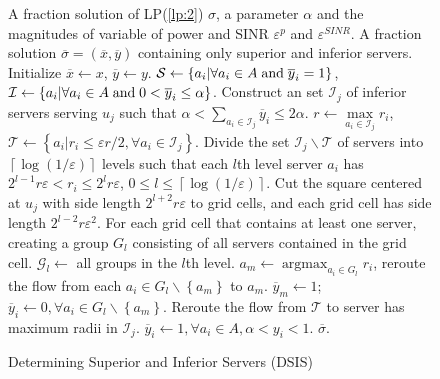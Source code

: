 \documentclass[11pt,a4paper]{article}
\begin{document}
\begin{figure}[!t]
	\renewcommand{\algorithmicrequire}{\textbf{Input:}}
	\renewcommand{\algorithmicensure}{\textbf{Output:}}
	\begin{algorithm}[H]
		\caption{Determining Superior and Inferior Servers (DSIS)}
		\begin{algorithmic}[1]\label{alg:DSIS}
			\REQUIRE A fraction solution of LP(\ref{lp:2}) $\sigma$, a parameter $\alpha$ and the magnitudes of variable of power and SINR ${\varepsilon ^p}$ and ${\varepsilon ^{SINR}}$.
			\ENSURE A fraction solution $\overline \sigma = ({\overline x},{\overline y})$ containing only superior and inferior servers.
			\STATE Initialize $\overline x \leftarrow x$, $\overline y \leftarrow y$.
			\STATE ${\mathcal{S}} \leftarrow \left\{ {{a_i}|\forall{a_i} \in A\; {\rm{and}} \; {{\overline y}_i} = 1} \right\}$, ${\mathcal{I}} \leftarrow \left\{ {{a_i}|\forall{a_i} \in A\; {\rm{and}} \; 0<{{\overline y}_i} \le \alpha} \right\}$.
			\STATE Construct an set $\mathcal{I}_j$ of inferior servers serving $u_j$  such that $\alpha < \sum\nolimits_{{a_i} \in \mathcal{I}_j} {{{\overline y }_i}}  \le 2\alpha $.
			\STATE $r \leftarrow \mathop {\max }\limits_{{a_i} \in {\mathcal{I}_j}} {r_i}$, $\mathcal{T}\leftarrow\left\{a_i|r_i \le {\varepsilon r}/2, \forall a_i \in \mathcal{I}_j \right\}$.
			\STATE Divide the set $\mathcal{I}_j \backslash \mathcal{T}$ of servers into $\left\lceil {\log (1/\varepsilon )} \right\rceil $ levels such that each $l$th level server $a_i$ has $2^{l-1}r \varepsilon < r_i \le 2^{l}r \varepsilon $, $0\le l \le \left\lceil {\log (1/\varepsilon )} \right \rceil$.
			\STATE Cut the square centered at $u_j$ with side length $2^{l+2}r \varepsilon$ to grid cells, and each grid cell has side length $2^{l-2}r \varepsilon^2$.
			\STATE For each grid cell that contains at least one server, creating a group $G_l$ consisting of all servers contained in the grid cell.
			\STATE $\mathcal{G}_l \leftarrow$ all groups in the $l$th level.
			\STATE $a_m \leftarrow \mathop {\arg \max }\nolimits_{{a_i} \in {G_l}} {r_i}$, reroute the flow from each $a_i\in G_l\backslash\left\{a_m\right\}$ to $a_m$.
			\STATE $\overline{y}_m\leftarrow 1$; $\overline{y}_i \leftarrow 0, \forall a_i \in G_l\backslash\left\{a_m\right\}$.
			\ENDFOR
			\ENDFOR
			\STATE Reroute the flow from $\mathcal{T}$ to server has maximum radii in $\mathcal{I}_j$.
			\ENDIF
			\ENDFOR
			\STATE $\overline{y}_i \leftarrow 1, \forall a_i \in A, \alpha < y_i < 1$.
			\RETURN $\overline{\sigma}$.
		\end{algorithmic}
	\end{algorithm}
\end{figure}
\end{document}
